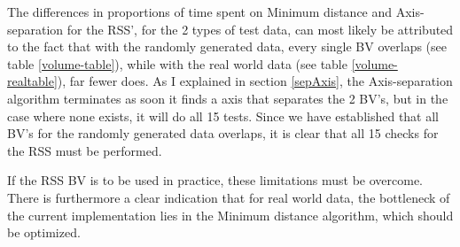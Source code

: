The differences in proportions of time spent on Minimum distance and Axis-separation for the RSS', for the 2 types of test data, can most likely be attributed to the fact that with the randomly generated data, every single BV overlaps (see table \ref{volume-table}), while with the real world data (see table \ref{volume-realtable}), far fewer does. As I explained in section \ref{sepAxis}, the Axis-separation algorithm terminates as soon it finds a axis that separates the 2 BV's, but in the case where none exists, it will do all 15 tests. Since we have established that all BV's for the randomly generated data overlaps, it is clear that all 15 checks for the RSS must be performed.  

If the RSS BV is to be used in practice, these limitations must be overcome. There is furthermore a clear indication that for real world data, the bottleneck of the current implementation lies in the Minimum distance algorithm, which should be optimized.
